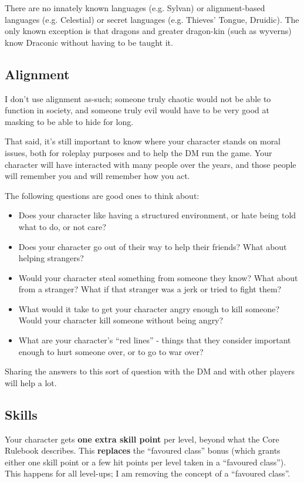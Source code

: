 There are no innately known languages (e.g. Sylvan) or alignment-based
languages (e.g. Celestial) or secret languages (e.g. Thieves' Tongue,
Druidic). The only known exception is that dragons and greater dragon-kin
(such as wyverns) know Draconic without having to be taught it.

%
\subsection{Alignment}

I don't use alignment as-such; someone truly chaotic would not be able to
function in society, and someone truly evil would have to be very good at
masking to be able to hide for long.

That said, it's still important to know where your character stands on
moral issues, both for roleplay purposes and to help the DM run the game.
Your character will have interacted with many people over the years, and
those people will remember you and will remember how you act.

The following questions are good ones to think about:

\begin{itemize}
%
\item Does your character like having a structured environment, or hate
being told what to do, or not care?
%
\item Does your character go out of their way to help their friends? What
about helping strangers?
%
\item Would your character steal something from someone they know? What
about from a stranger? What if that stranger was a jerk or tried to fight
them?
%
\item What would it take to get your character angry enough to kill
someone? Would your character kill someone without being angry?
%
\item What are your character's ``red lines'' - things that they consider
important enough to hurt someone over, or to go to war over?
%
\end{itemize}

Sharing the answers to this sort of question with the DM and with other
players will help a lot.

%
\subsection{Skills}

Your character gets \textbf{one extra skill point} per level, beyond what
the Core Rulebook describes. This \textbf{replaces} the ``favoured class''
bonus (which grants either one skill point or a few hit points per level
taken in a ``favoured class''). This happens for all level-ups; I am
removing the concept of a ``favoured class''.

